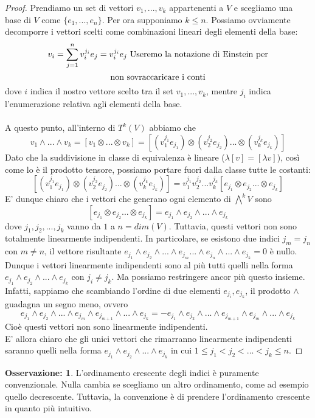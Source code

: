\documentclass[12pt,a4paper]{report}
\theoremstyle{definition}
\theoremstyle{Theorem}
\theoremstyle{definition}
\theoremstyle{definition}
\theoremstyle{definition}
\newtheorem{Obs}[Def]{Osservazione:}
\begin{document}
	\begin{proof}
		Prendiamo un set di vettori $v_1,...,v_k$ appartenenti a $V$ e scegliamo una base di $V$ come $\{e_1,...,e_n\}$. Per ora supponiamo $k\leq n$. Possiamo ovviamente decomporre i vettori scelti come combinazioni lineari degli elementi della base:
		$$v_i=\sum_{j=1}^{n} v^{j_i}_i e_j=v^{j_i}_i e_j \hbox{ Useremo la notazione di Einstein per} $$$$\hbox{non sovraccaricare i conti}$$
		dove $i$ indica il nostro vettore scelto tra il set $v_1,...,v_k$, mentre $j_i$ indica l'enumerazione relativa agli elementi della base.\\
		\\
		A questo punto, all'interno di $T^k(V)$ abbiamo che
		$$v_1\wedge...\wedge v_k=[v_1\otimes...\otimes v_k]=[(v^{j_1}_1 e_{j_1})\otimes(v^{j_2}_2 e_{j_2})...\otimes (v^{j_k}_k e_{j_k})]$$
		Dato che la suddivisione in classe di equivalenza è lineare ($\lambda[v]=[\lambda v]$), così come lo è il prodotto tensore, possiamo portare fuori dalla classe tutte le costanti:
		$$[(v^{j_1}_1 e_{j_1})\otimes(v^{j_2}_2 e_{j_2})...\otimes (v^{j_k}_k e_{j_k})]=v^{j_1}_1v^{j_2}_2...v^{j_k}_k[ e_{j_1}\otimes e_{j_2}...\otimes  e_{j_k}]$$
		E' dunque chiaro che i vettori che generano ogni elemento di $\bigwedge^k V$ sono 
		$$[ e_{j_1}\otimes e_{j_2}...\otimes  e_{j_k}]= e_{j_1}\wedge e_{j_2}\wedge ...\wedge e_{j_k}$$
		dove $j_1,j_2,...,j_k$ vanno da $1$ a $n=dim(V)$. Tuttavia, questi vettori non sono totalmente linearmente indipendenti. In particolare, se esistono due indici $j_m=j_n$ con $m\neq n$, il vettore risultante $e_{j_1}\wedge e_{j_2}\wedge ...\wedge e_{j_m}...\wedge e_{j_n}\wedge...\wedge e_{j_k}=0$ è nullo. Dunque i vettori linearmente indipendenti sono al più tutti quelli nella forma $e_{j_1}\wedge e_{j_2}\wedge ...\wedge e_{j_k}$ con $j_i\neq j_k$. Ma possiamo restringere ancor più questo insieme. Infatti, sappiamo che scambiando l'ordine di due elementi $e_{j_i}, e_{j_k}$, il prodotto $\wedge$ guadagna un segno meno, ovvero
		$$e_{j_1}\wedge e_{j_2}\wedge ...\wedge e_{j_m}\wedge e_{j_{m+1}}\wedge...\wedge e_{j_k}=-e_{j_1}\wedge e_{j_2}\wedge ...\wedge e_{j_{m+1}}\wedge e_{j_{m}}\wedge...\wedge e_{j_k}$$
		Cioè questi vettori non sono linearmente indipendenti.\\
		E' allora chiaro che gli unici vettori che rimarranno linearmente indipendenti saranno quelli nella forma $e_{j_1}\wedge e_{j_2}\wedge ...\wedge e_{j_k}$ in cui $1\leq j_1<j_2<...< j_k\leq n$.
	\end{proof}
	\begin{Obs}
		L'ordinamento crescente degli indici è puramente convenzionale. Nulla cambia se scegliamo un altro ordinamento, come ad esempio quello decrescente. Tuttavia, la convenzione è di prendere l'ordinamento crescente in quanto più intuitivo.
	\end{Obs}
\end{document}
